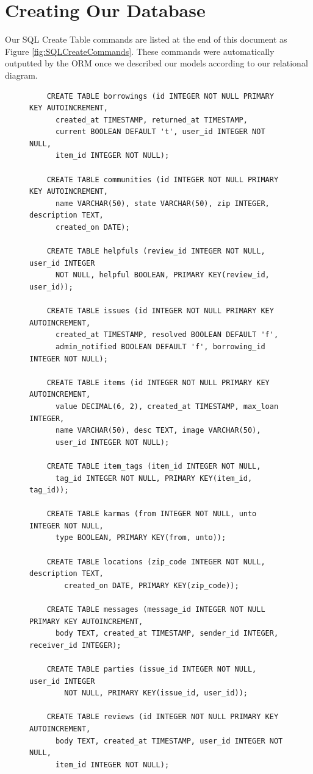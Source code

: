 \documentclass{acm_proc_article-sp}
\begin{document}
\section{Creating Our Database}
Our SQL Create Table commands are listed at the end of this document as Figure \ref{fig:SQLCreateCommands}. These commands
were automatically outputted by the ORM once we described our models according to our relational diagram.
\begin{figure}[p]
    \begin{lstlisting}
    CREATE TABLE borrowings (id INTEGER NOT NULL PRIMARY KEY AUTOINCREMENT, 
      created_at TIMESTAMP, returned_at TIMESTAMP, 
      current BOOLEAN DEFAULT 't', user_id INTEGER NOT NULL, 
      item_id INTEGER NOT NULL);

    CREATE TABLE communities (id INTEGER NOT NULL PRIMARY KEY AUTOINCREMENT,
      name VARCHAR(50), state VARCHAR(50), zip INTEGER, description TEXT, 
      created_on DATE);

    CREATE TABLE helpfuls (review_id INTEGER NOT NULL, user_id INTEGER 
      NOT NULL, helpful BOOLEAN, PRIMARY KEY(review_id, user_id));

    CREATE TABLE issues (id INTEGER NOT NULL PRIMARY KEY AUTOINCREMENT, 
      created_at TIMESTAMP, resolved BOOLEAN DEFAULT 'f', 
      admin_notified BOOLEAN DEFAULT 'f', borrowing_id INTEGER NOT NULL);

    CREATE TABLE items (id INTEGER NOT NULL PRIMARY KEY AUTOINCREMENT, 
      value DECIMAL(6, 2), created_at TIMESTAMP, max_loan INTEGER, 
      name VARCHAR(50), desc TEXT, image VARCHAR(50), 
      user_id INTEGER NOT NULL);

    CREATE TABLE item_tags (item_id INTEGER NOT NULL, 
      tag_id INTEGER NOT NULL, PRIMARY KEY(item_id, tag_id));

    CREATE TABLE karmas (from INTEGER NOT NULL, unto INTEGER NOT NULL, 
      type BOOLEAN, PRIMARY KEY(from, unto));

    CREATE TABLE locations (zip_code INTEGER NOT NULL, description TEXT, 
        created_on DATE, PRIMARY KEY(zip_code));

    CREATE TABLE messages (message_id INTEGER NOT NULL PRIMARY KEY AUTOINCREMENT, 
      body TEXT, created_at TIMESTAMP, sender_id INTEGER, receiver_id INTEGER);

    CREATE TABLE parties (issue_id INTEGER NOT NULL, user_id INTEGER 
        NOT NULL, PRIMARY KEY(issue_id, user_id));

    CREATE TABLE reviews (id INTEGER NOT NULL PRIMARY KEY AUTOINCREMENT, 
      body TEXT, created_at TIMESTAMP, user_id INTEGER NOT NULL, 
      item_id INTEGER NOT NULL);


\end{lstlisting}
\end{figure}
\end{document}
